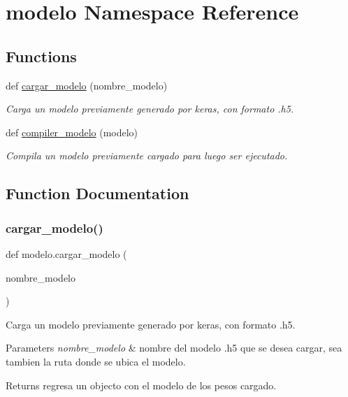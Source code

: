 \hypertarget{namespacemodelo}{}\section{modelo Namespace Reference}
\label{namespacemodelo}
\subsection*{Functions}
\begin{DoxyCompactItemize}
\item 
def \mbox{\hyperlink{namespacemodelo_a1003684c17149ab9b5f89f9e77b687a7}{cargar\+\_\+modelo}} (nombre\+\_\+modelo)
\begin{DoxyCompactList}\small\item\em Carga un modelo previamente generado por keras, con formato .h5. \end{DoxyCompactList}\item 
def \mbox{\hyperlink{namespacemodelo_a4a48c138f410a4c8a4021e2696b7d5c6}{compiler\+\_\+modelo}} (modelo)
\begin{DoxyCompactList}\small\item\em Compila un modelo previamente cargado para luego ser ejecutado. \end{DoxyCompactList}\end{DoxyCompactItemize}


\subsection{Function Documentation}
\mbox{\label{namespacemodelo_a1003684c17149ab9b5f89f9e77b687a7}} 
\subsubsection{\texorpdfstring{cargar\+\_\+modelo()}{cargar\_modelo()}}
{\footnotesize\ttfamily def modelo.\+cargar\+\_\+modelo (\begin{DoxyParamCaption}\item[{}]{nombre\+\_\+modelo }\end{DoxyParamCaption})}



Carga un modelo previamente generado por keras, con formato .h5. 


\begin{DoxyParams}{Parameters}
{\em nombre\+\_\+modelo} & nombre del modelo .h5 que se desea cargar, sea tambien la ruta donde se ubica el modelo. \\
\hline
\end{DoxyParams}
\begin{DoxyReturn}{Returns}
regresa un objecto con el modelo de los pesos cargado. 
\end{DoxyReturn}
\mbox{\label{namespacemodelo_a4a48c138f410a4c8a4021e2696b7d5c6}} 
